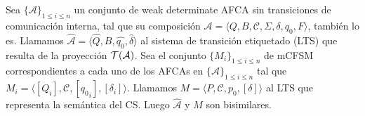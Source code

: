 \begin{theorem} Sea $\{\mathcal{A}\}_{1 \leq i \leq n}$ un conjunto de weak determinate AFCA sin transiciones de comunicación interna, tal que su composición $\mathcal{A} = \langle Q, B, \mathcal{C},\Sigma, \delta, q_0, F \rangle$, también lo es. Llamamos $\widehat{\mathcal{A}} = \langle \widehat{Q}, B, \widehat{q_0}, \widehat{\delta} \rangle$ al sistema de transición etiquetado (LTS) que resulta de la proyección $\mathcal{T}(\mathcal{A})$. Sea el conjunto $\{M_i\}_{1 \leq i \leq n}$ de mCFSM correspondientes a cada uno de los AFCAs en $\{\mathcal{A}\}_{1 \leq i \leq n}$ tal que $M_i = \langle [Q_i], \mathcal{C}, [{q_0}_i], [\delta_i] \rangle$. Llamamos $M = \langle P, \mathcal{C}, {p_0}, [\delta] \rangle$ al LTS que representa la semántica del CS. Luego $\widehat{\mathcal{A}}$ y $M$ son bisimilares. 
\end{theorem}

